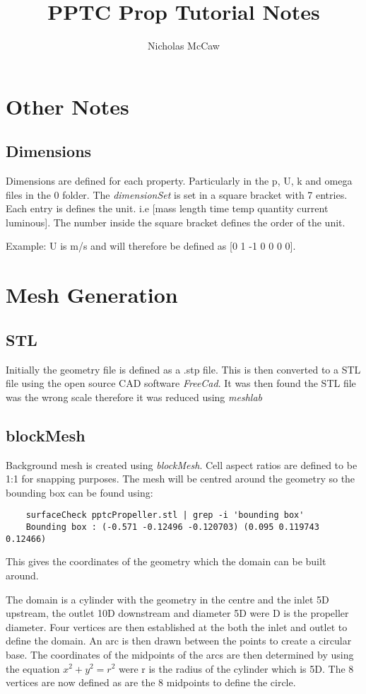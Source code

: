 \documentclass{article}
\title{PPTC Prop Tutorial Notes}
\author{Nicholas McCaw}
\begin{document}
	\maketitle
	\section{Other Notes}
	\subsection{Dimensions}
	Dimensions are defined for each property. Particularly in the p, U, k and omega files in the 0 folder. The \textit{dimensionSet} is set in a square bracket with 7 entries. Each entry is defines the unit. i.e [mass length time temp quantity current luminous]. The number inside the square bracket defines the order of the unit.
	
	Example: U is m/s and will therefore be defined as [0 1 -1 0 0 0 0].
	
	\section{Mesh Generation}
	\subsection{STL}
	Initially the geometry file is defined as a .stp file. This is then converted to a STL file using the open source CAD software \textit{FreeCad}. It was then found the STL file was the wrong scale therefore it was reduced using \textit{meshlab}
	
	\subsection{blockMesh}
	Background mesh is created using \textit{blockMesh}. Cell aspect ratios are defined to be 1:1 for snapping purposes. The mesh will be centred around the geometry so the bounding box can be found using:
	
	\begin{lstlisting}
	surfaceCheck pptcPropeller.stl | grep -i 'bounding box'
	Bounding box : (-0.571 -0.12496 -0.120703) (0.095 0.119743 0.12466)\end{lstlisting}
	
	This gives the coordinates of the geometry which the domain can be built around. 
	
	The domain is a cylinder with the geometry in the centre and the inlet 5D upstream, the outlet 10D downstream and diameter 5D were D is the propeller diameter. Four vertices are then established at the both the inlet and outlet to define the domain. An arc is then drawn between the points to create a circular base. The coordinates of the midpoints of the arcs are then determined by using the equation $x^2 + y^2 = r^2$ were r is the radius of the cylinder which is 5D. The 8 vertices are now defined as are the 8 midpoints to define the circle.
	
\end{document}
